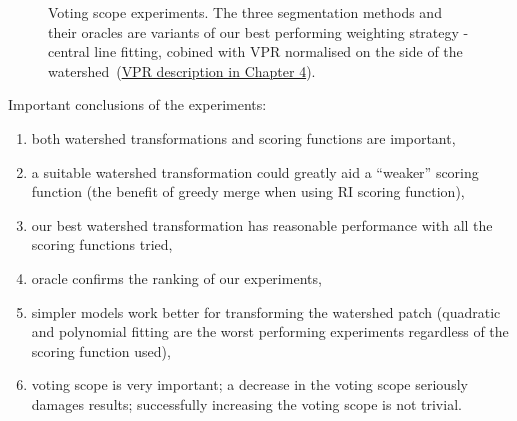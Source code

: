\begin{figure}[ht!]
\centering
\caption{Voting scope experiments. The three segmentation methods and their oracles are variants of our best performing weighting strategy - central line fitting, cobined with VPR normalised on the side of the watershed~(\hyperref[VPR-maths]{VPR description in Chapter 4}).} %
\label{fig:voting-scope-line-centre-VPR-ws}
\end{figure}

Important conclusions of the experiments:
\begin{enumerate}
 \item both watershed transformations and scoring functions are important,
 \item a suitable %
 watershed transformation could greatly aid a ``weaker'' scoring function (\eg the benefit of greedy merge when using RI scoring function),
 \item our best watershed transformation has reasonable performance with all the scoring functions tried,
 \item oracle confirms the ranking of our experiments,
 \item simpler models work better for transforming the watershed patch (\eg quadratic and polynomial fitting are the worst performing experiments regardless of the scoring function used),
 \item voting scope is very important; a decrease in the voting scope seriously damages results; successfully increasing the voting scope is not trivial.
\end{enumerate}